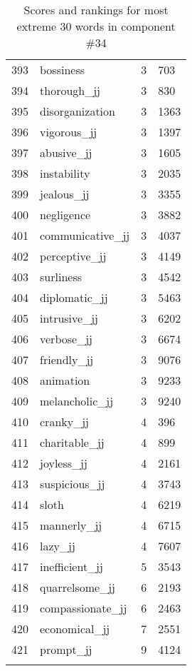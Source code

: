 \begin{longtable}[!htbp]{| rlr@{.}l |}
    393 & bossiness & 3 & 703 \\
    394 & thorough\_jj & 3 & 830 \\
    395 & disorganization & 3 & 1363 \\
    396 & vigorous\_jj & 3 & 1397 \\
    397 & abusive\_jj & 3 & 1605 \\
    398 & instability & 3 & 2035 \\
    399 & jealous\_jj & 3 & 3355 \\
    400 & negligence & 3 & 3882 \\
    401 & communicative\_jj & 3 & 4037 \\
    402 & perceptive\_jj & 3 & 4149 \\
    403 & surliness & 3 & 4542 \\
    404 & diplomatic\_jj & 3 & 5463 \\
    405 & intrusive\_jj & 3 & 6202 \\
    406 & verbose\_jj & 3 & 6674 \\
    407 & friendly\_jj & 3 & 9076 \\
    408 & animation & 3 & 9233 \\
    409 & melancholic\_jj & 3 & 9240 \\
    410 & cranky\_jj & 4 & 396 \\
    411 & charitable\_jj & 4 & 899 \\
    412 & joyless\_jj & 4 & 2161 \\
    413 & suspicious\_jj & 4 & 3743 \\
    414 & sloth & 4 & 6219 \\
    415 & mannerly\_jj & 4 & 6715 \\
    416 & lazy\_jj & 4 & 7607 \\
    417 & inefficient\_jj & 5 & 3543 \\
    418 & quarrelsome\_jj & 6 & 2193 \\
    419 & compassionate\_jj & 6 & 2463 \\
    420 & economical\_jj & 7 & 2551 \\
    421 & prompt\_jj & 9 & 4124 \\
    \hline
    \caption{Scores and rankings for most extreme 30 words in component \#34} \\
\end{longtable}
